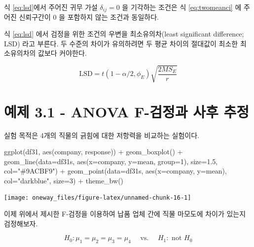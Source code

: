 \documentclass[
]{book}
\newenvironment{Shaded}{\begin{snugshade}}{\end{snugshade}}
\newcommand{\AttributeTok}[1]{\textcolor[rgb]{0.77,0.63,0.00}{#1}}
\newcommand{\DecValTok}[1]{\textcolor[rgb]{0.00,0.00,0.81}{#1}}
\newcommand{\FloatTok}[1]{\textcolor[rgb]{0.00,0.00,0.81}{#1}}
\newcommand{\FunctionTok}[1]{\textcolor[rgb]{0.00,0.00,0.00}{#1}}
\newcommand{\NormalTok}[1]{#1}
\newcommand{\SpecialCharTok}[1]{\textcolor[rgb]{0.00,0.00,0.00}{#1}}
\newcommand{\StringTok}[1]{\textcolor[rgb]{0.31,0.60,0.02}{#1}}
\begin{document}
식 \eqref{eq:lsd}에서 주어진 귀무 가설 \(\delta_{ij}=0\) 을 기각하는 조건은 식 \eqref{eq:twomeanci} 에 주어진 신뢰구간이 0 을 포함하지 않는 조건과 동일하다.

식 \eqref{eq:lsd} 에서 검정을 위한 조건의 우변을 최소유의차(least significant difference; LSD) 라고 부른다. 두 수준의 차이가 유의하려면 두 평균 차이의 절대값이 최소한 최소유의차의 값보다 커야한다.

\[  \text{LSD} =t(1-\alpha/2, \phi_E) \sqrt{ \frac{2MS_E}{r}}  \]

\hypertarget{uxc608uxc81c-3.1---anova-f-uxac80uxc815uxacfc-uxc0acuxd6c4-uxcd94uxc815}{%
\section{예제 3.1 - ANOVA F-검정과 사후 추정}\label{uxc608uxc81c-3.1---anova-f-uxac80uxc815uxacfc-uxc0acuxd6c4-uxcd94uxc815}}

실험 목적은 4개의 직물의 긁힘에 대한 저항력을 비교하는 실험이다.

\begin{Shaded}
\begin{Highlighting}[]
\FunctionTok{ggplot}\NormalTok{(df31, }\FunctionTok{aes}\NormalTok{(company, response)) }\SpecialCharTok{+}
  \FunctionTok{geom\_boxplot}\NormalTok{() }\SpecialCharTok{+} 
  \FunctionTok{geom\_line}\NormalTok{(}\AttributeTok{data=}\NormalTok{df31s, }\FunctionTok{aes}\NormalTok{(}\AttributeTok{x=}\NormalTok{company, }\AttributeTok{y=}\NormalTok{mean, }\AttributeTok{group=}\DecValTok{1}\NormalTok{), }\AttributeTok{size=}\FloatTok{1.5}\NormalTok{, }\AttributeTok{col=}\StringTok{"\#9ACBF9"}\NormalTok{) }\SpecialCharTok{+}
  \FunctionTok{geom\_point}\NormalTok{(}\AttributeTok{data=}\NormalTok{df31s, }\FunctionTok{aes}\NormalTok{(}\AttributeTok{x=}\NormalTok{company, }\AttributeTok{y=}\NormalTok{mean), }\AttributeTok{col=}\StringTok{"darkblue"}\NormalTok{, }\AttributeTok{size=}\DecValTok{3}\NormalTok{) }\SpecialCharTok{+}
  \FunctionTok{theme\_bw}\NormalTok{()}
\end{Highlighting}
\end{Shaded}

\begin{center}\texttt{[image: oneway\_files/figure-latex/unnamed-chunk-16-1]} \end{center}

이제 위에서 제시한 F-검정을 이용하여 납품 업체 간에 직물 마모도에 차이가 있는지 검정해보자.

\[ H_0: \mu_1=\mu_2=\mu_3=\mu_4 \quad \text{ vs. }\quad H_1: \text{ not } H_0 \]
\end{document}
